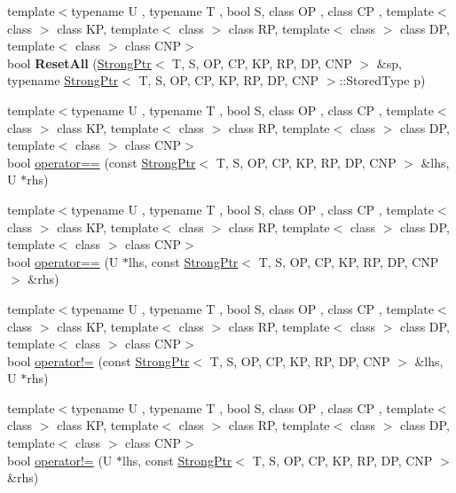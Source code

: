 \begin{DoxyCompactItemize}
\item 
\hypertarget{namespaceLoki_ae8d16ef52b540422457b796e35200a30}{}{\footnotesize template$<$typename U , typename T , bool S, class O\+P , class C\+P , template$<$ class $>$ class K\+P, template$<$ class $>$ class R\+P, template$<$ class $>$ class D\+P, template$<$ class $>$ class C\+N\+P$>$ }\\bool {\bfseries Reset\+All} (\hyperlink{classLoki_1_1StrongPtr}{Strong\+Ptr}$<$ T, S, O\+P, C\+P, K\+P, R\+P, D\+P, C\+N\+P $>$ \&sp, typename \hyperlink{classLoki_1_1StrongPtr}{Strong\+Ptr}$<$ T, S, O\+P, C\+P, K\+P, R\+P, D\+P, C\+N\+P $>$\+::Stored\+Type p)\label{namespaceLoki_ae8d16ef52b540422457b796e35200a30}

\item 
{\footnotesize template$<$typename U , typename T , bool S, class O\+P , class C\+P , template$<$ class $>$ class K\+P, template$<$ class $>$ class R\+P, template$<$ class $>$ class D\+P, template$<$ class $>$ class C\+N\+P$>$ }\\bool \hyperlink{group__SmartPointerGroup_ga07aa8a1b2cb0199fb22738a7092756bc}{operator==} (const \hyperlink{classLoki_1_1StrongPtr}{Strong\+Ptr}$<$ T, S, O\+P, C\+P, K\+P, R\+P, D\+P, C\+N\+P $>$ \&lhs, U $\ast$rhs)
\item 
{\footnotesize template$<$typename U , typename T , bool S, class O\+P , class C\+P , template$<$ class $>$ class K\+P, template$<$ class $>$ class R\+P, template$<$ class $>$ class D\+P, template$<$ class $>$ class C\+N\+P$>$ }\\bool \hyperlink{group__SmartPointerGroup_ga48c72731581ab583eec9089f89f7952d}{operator==} (U $\ast$lhs, const \hyperlink{classLoki_1_1StrongPtr}{Strong\+Ptr}$<$ T, S, O\+P, C\+P, K\+P, R\+P, D\+P, C\+N\+P $>$ \&rhs)
\item 
{\footnotesize template$<$typename U , typename T , bool S, class O\+P , class C\+P , template$<$ class $>$ class K\+P, template$<$ class $>$ class R\+P, template$<$ class $>$ class D\+P, template$<$ class $>$ class C\+N\+P$>$ }\\bool \hyperlink{group__SmartPointerGroup_ga96776169708326535577e35ed03b0206}{operator!=} (const \hyperlink{classLoki_1_1StrongPtr}{Strong\+Ptr}$<$ T, S, O\+P, C\+P, K\+P, R\+P, D\+P, C\+N\+P $>$ \&lhs, U $\ast$rhs)
\item 
{\footnotesize template$<$typename U , typename T , bool S, class O\+P , class C\+P , template$<$ class $>$ class K\+P, template$<$ class $>$ class R\+P, template$<$ class $>$ class D\+P, template$<$ class $>$ class C\+N\+P$>$ }\\bool \hyperlink{group__SmartPointerGroup_gaca7b2b5192e9fb2952e93dd3083205a8}{operator!=} (U $\ast$lhs, const \hyperlink{classLoki_1_1StrongPtr}{Strong\+Ptr}$<$ T, S, O\+P, C\+P, K\+P, R\+P, D\+P, C\+N\+P $>$ \&rhs)

\end{DoxyCompactItemize}
